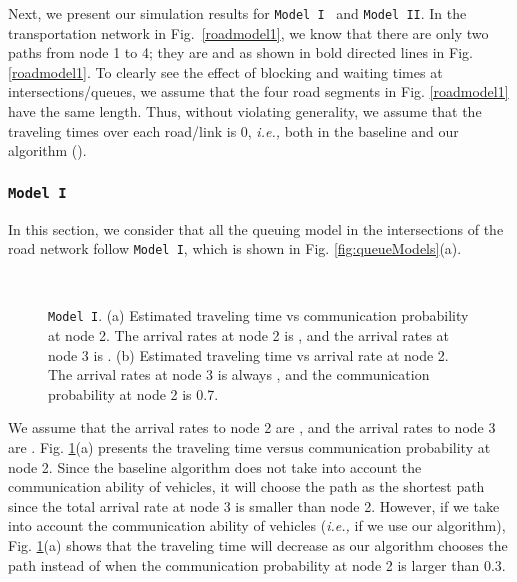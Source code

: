 \documentclass[conference]{IEEEtran}
\newcommand{\ie}{{\em i.e., }}
\newcommand{\modelI}{{\tt{Model I}}}
\newcommand{\modelII}{{\tt{Model II}}}
\begin{document}
Next, we present our simulation results for \modelI~ and  \modelII. In the transportation network in Fig.~\ref{roadmodel1}, we know that there are only two paths from node 1 to 4; they are  and  as shown in bold directed lines in Fig. \ref{roadmodel1}. To clearly see the effect of blocking and waiting times at intersections/queues, we assume that the four road segments in Fig. \ref{roadmodel1} have the same length. Thus, without violating generality, we assume that the traveling times over each road/link is 0, \ie both in the baseline and our algorithm  ().

\subsubsection{\modelI}
In this section, we consider that all the queuing model in the intersections of the road network follow \modelI, which is shown in Fig. \ref{fig:queueModels}(a).

\begin{figure}[t!]
\vspace{10pt}
\begin{center}
 \\
\end{center}
\begin{center}
\vspace{-5pt}
\caption{\label{fig:sim_4nodes2paths_modelI} \modelI. (a) Estimated traveling time vs communication probability  at node 2. The arrival rates at node 2 is , and the arrival rates at node 3 is . (b) Estimated traveling time vs arrival rate at node 2. The arrival rates at node 3 is always , and the communication probability  at node 2 is 0.7.}
\vspace{-15pt}
\end{center}
\end{figure}




We assume that the arrival rates to node 2 are , and the arrival rates to node 3 are . Fig. \ref{fig:sim_4nodes2paths_modelI}(a) presents the traveling time versus communication probability  at node 2. Since the baseline algorithm does not take into account the communication ability of vehicles, it will choose the path  as the shortest path since the total arrival rate at node 3 is smaller than node 2. However, if we take into account the communication ability of vehicles (\ie if we use our algorithm), Fig. \ref{fig:sim_4nodes2paths_modelI}(a) shows that the traveling time will decrease as our algorithm chooses the path  instead of  when the communication probability  at node 2 is larger than 0.3.
\end{document}

